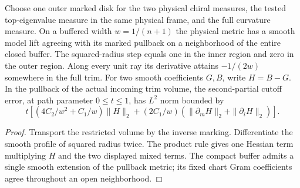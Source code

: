 \begin{proposition}
\label{prop:ed03-physical-marked-jets}
\leanok
Choose one outer marked disk for the two physical chiral measures, the
tested top-eigenvalue measure in the same physical frame, and the full
curvature measure. On a buffered width $w=1/(n+1)$ the physical metric
has a smooth model lift agreeing with its marked pullback on a neighborhood
of the entire closed buffer. The squared-radius step equals one in the
inner region and zero in the outer region. Along every unit ray its
derivative attains $-1/(2w)$ somewhere in the full trim.
For two smooth coefficients $G,B$, write $H=B-G$. In the pullback of the
actual incoming trim volume, the second-partial cutoff error, at path
parameter $0\le t\le1$, has $L^2$ norm bounded by
\[
 t\left[\left(4C_2/w^2+C_1/w\right)\|H\|_2
   +(2C_1/w)\left(\|\partial_m H\|_2+\|\partial_i H\|_2\right)\right].
\]
\end{proposition}
\begin{proof}
\leanok
Transport the restricted volume by the inverse marking. Differentiate
the smooth profile of squared radius twice. The product rule gives one
Hessian term multiplying $H$ and the two displayed mixed terms. The
compact buffer admits a single smooth extension of the pullback metric;
its fixed chart Gram coefficients agree throughout an open neighborhood.
\end{proof}

